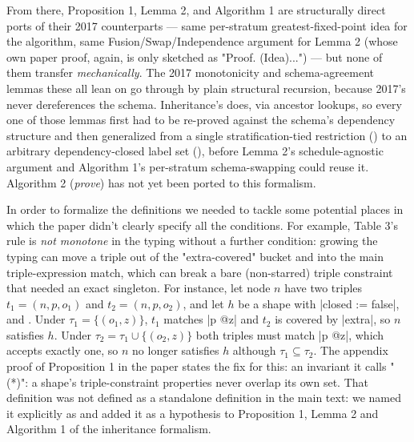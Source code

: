 From there, Proposition 1, Lemma 2, and Algorithm 1 are structurally direct
ports of their 2017 counterparts — same per-stratum greatest-fixed-point
idea for the algorithm, same Fusion/Swap/Independence argument for Lemma 2
(whose own paper proof, again, is only sketched as "Proof. (Idea)...") —
but none of them transfer \emph{mechanically}. 
The 2017 monotonicity and schema-agreement lemmas these all lean on go through by plain structural
recursion, because 2017's  never dereferences the schema.
Inheritance's  does, via ancestor lookups, so every one of those
lemmas first had to be re-proved against the schema's dependency structure
and then generalized from a single stratification-tied restriction
() to an arbitrary dependency-closed label set
(), before Lemma 2's schedule-agnostic argument and
Algorithm 1's per-stratum schema-swapping could reuse it. Algorithm 2
(\emph{prove}) has not yet been ported to this formalism.

In order to formalize the definitions we needed to tackle some potential
 places in which the paper didn't clearly specify all the conditions.  
For example, Table 3's  rule is
\emph{not monotone} in the typing without a further condition: 
growing the typing can move a triple out of the "extra-covered" bucket and 
into the main triple-expression match, which can break a bare 
(non-starred) triple constraint that needed an exact singleton. 
For instance, let node $n$ have two triples $t_1=(n,p,o_1)$ and
$t_2=(n,p,o_2)$, and let $h$ be a shape with \lean|closed := false|, 
 and 
.
Under $\tau_1=\{(o_1,z)\}$, $t_1$ matches \lean|p @z| and 
$t_2$ is covered by \lean|extra|, 
so $n$ satisfies $h$. Under $\tau_2=\tau_1\cup\{(o_2,z)\}$
both triples must match \lean|p @z|, which accepts exactly one, 
so $n$ no
longer satisfies $h$ although $\tau_1 \subseteq \tau_2$.
The appendix proof of Proposition 1 in the paper states the fix for this: 
an invariant it calls "(*)": a shape's triple-constraint properties 
never overlap its own  set. 
That definition was not defined as a standalone definition 
in the main text: 
we named it explicitly as  and 
added it as a hypothesis to Proposition 1, Lemma 2 and Algorithm 1 of the inheritance formalism.

